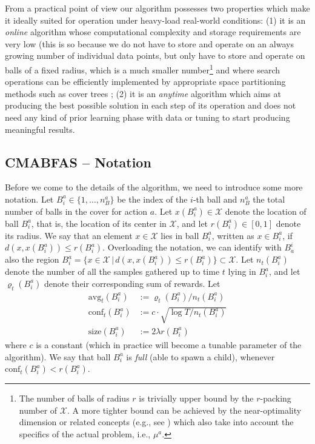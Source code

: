 \documentclass{llncs}
\begin{document}
From a practical point of view our algorithm possesses two properties which make it
ideally suited for operation under heavy-load real-world conditions: (1) it is an
{\em online} algorithm whose computational complexity and storage requirements are
very low (this is so because we do not have to store and operate on an always growing
number of individual data points, but only have to store and operate on balls of a fixed radius, 
which is a much smaller
number\footnote{The number of balls of radius $r$ is trivially upper bound by the $r$-packing number of
$\mathcal X$. A more tighter bound can be achieved by the near-optimality dimension or related concepts 
(e.g., see \cite{Xarmed_bubeck,DBLP:journals/corr/abs-0907-3986}) which also take into account 
the specifics of the actual problem, i.e., $\mu^a$.} and where search operations can be efficiently implemented by appropriate
space partitioning methods such as cover trees \cite{covertree}; (2) it is an {\em anytime}
algorithm which aims at producing the best possible solution in each step of its 
operation and does not need any kind of prior learning phase with data or tuning
to start producing meaningful results.

\subsection{\bf CMABFAS -- Notation} 
\label{sec:cmab_notation}
Before we come to the details of the algorithm, we need to introduce some more
notation. 
Let $B_i^a \in \{1,\ldots,n_B^a\}$ be the index of the $i$-th ball and 
$n_B^a$ the total number of balls in the cover for action $a$. Let 
$x(B_i^a)\in \mathcal X$ denote the location of ball $B_i^a$, that is,
the location of its center in $\mathcal X$, and let $r(B_i^a)\in [0,1]$
denote its radius. We say that an element $x \in \mathcal X$ lies in ball
$B_i^a$, written as $x \in B_i^a$, if $d(x,x(B_i^a))\le r(B_i^a)$. 
Overloading the notation, we can identify with $B^i_a$ also the region 
$B_i^a=\{x\in \mathcal X \,| \, d(x,x(B^a_i)) \le r(B_i^a)\}\subset \mathcal X$.
Let $n_t(B_i^a)$ denote the number of all the samples gathered up to time $t$
lying in $B_i^a$, and let $\varrho_t(B_i^a)$ denote their corresponding
sum of rewards. Let 
\begin{align*}
\text{avg}_t (B_i^a) & :=  \varrho_t(B_i^a)/ n_t(B_i^a) \\
\text{conf}_t (B_i^a) & := c \cdot \sqrt{ \log T /n_t(B_i^a)} \\
\text{size} (B_i^a) & :=  2\lambda r(B_i^a)
\end{align*} 
where $c$ is a constant (which in practice will become a tunable parameter of the algorithm).
We say that ball $B_i^a$ is {\em full} (able to spawn a child), whenever 
$\text{conf}_t (B_i^a)<r(B_i^a)$. 
\end{document}
